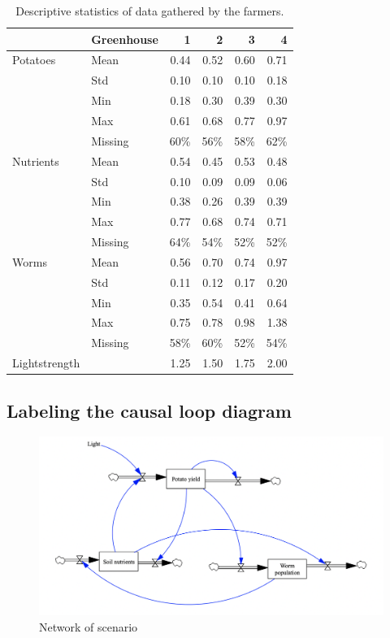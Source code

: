 \documentclass[a4paper]{article}
\begin{document}
\begin{table}[h]
\caption{\label{tab:descr_data}Descriptive statistics of data gathered by the farmers.}
\centering
\begin{tabular}{llrrrr}
 & Greenhouse & 1 & 2 & 3 & 4\\
\hline
Potatoes & Mean & 0.44 & 0.52 & 0.60 & 0.71\\
 & Std & 0.10 & 0.10 & 0.10 & 0.18\\
 & Min & 0.18 & 0.30 & 0.39 & 0.30\\
 & Max & 0.61 & 0.68 & 0.77 & 0.97\\
 & Missing & 60\% & 56\% & 58\% & 62\%\\
\hline
Nutrients & Mean & 0.54 & 0.45 & 0.53 & 0.48\\
 & Std & 0.10 & 0.09 & 0.09 & 0.06\\
 & Min & 0.38 & 0.26 & 0.39 & 0.39\\
 & Max & 0.77 & 0.68 & 0.74 & 0.71\\
 & Missing & 64\% & 54\% & 52\% & 52\%\\
\hline
Worms & Mean & 0.56 & 0.70 & 0.74 & 0.97\\
 & Std & 0.11 & 0.12 & 0.17 & 0.20\\
 & Min & 0.35 & 0.54 & 0.41 & 0.64\\
 & Max & 0.75 & 0.78 & 0.98 & 1.38\\
 & Missing & 58\% & 60\% & 52\% & 54\%\\
\hline
Lightstrength &  & 1.25 & 1.50 & 1.75 & 2.00\\
\end{tabular}
\end{table}

\clearpage
\subsection*{Labeling the causal loop diagram}
\label{sec:org61e712e}

\begin{figure}[h]
\centering
\includegraphics[width=1\linewidth]{image.png}
\caption{\label{fig:network}Network of scenario}
\end{figure}

\par\vspace{\baselineskip}\noindent

\par\vspace{\baselineskip}\noindent
\end{document}
